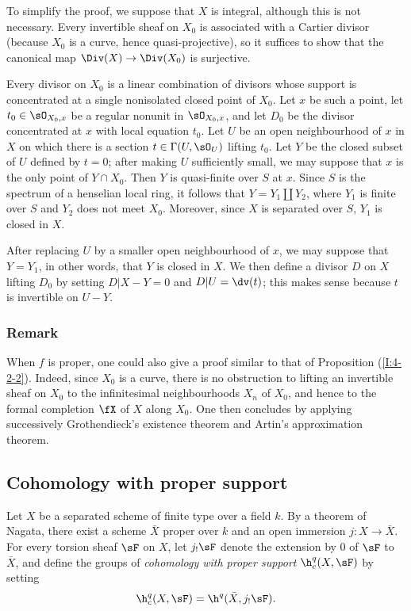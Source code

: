 To simplify the proof, we suppose that $X$ is integral, although this is
not necessary. Every invertible sheaf on $X_0$ is associated with a
Cartier divisor (because $X_0$ is a curve, hence quasi-projective), so it
suffices to show that the canonical map $\Div(X)\to\Div(X_0)$ is
surjective.

Every divisor on $X_0$ is a linear combination of divisors whose support
is concentrated at a single nonisolated closed point of $X_0$. Let $x$
be such a point, let $t_0\in\sO_{X_0,x}$ be a regular nonunit in
$\sO_{X_0,x}$, and let $D_0$ be the divisor concentrated at $x$ with
local equation $t_0$. Let $U$ be an open neighbourhood of $x$ in $X$
on which there is a section $t\in\Gamma(U,\sO_U)$ lifting $t_0$. Let
$Y$ be the closed subset of $U$ defined by $t=0$; after making $U$
sufficiently small, we may suppose that $x$ is the only point of
$Y\cap X_0$. Then $Y$ is quasi-finite over $S$ at $x$. Since $S$ is
the spectrum of a henselian local ring, it follows that
$Y=Y_1\amalg Y_2$, where $Y_1$ is finite over $S$ and $Y_2$ does not
meet $X_0$. Moreover, since $X$ is separated over $S$, $Y_1$ is closed
in $X$.

After replacing $U$ by a smaller open neighbourhood of $x$, we may
suppose that $Y=Y_1$, in other words, that $Y$ is closed in $X$. We then
define a divisor $D$ on $X$ lifting $D_0$ by setting
$D|X- Y=0$ and $D|U=\dv(t)$; this makes sense because $t$ is
invertible on $U- Y$.

\subsubsection{Remark}\label{I:4-4-2}

When $f$ is proper, one could also give a proof similar to that of
Proposition (\ref{I:4-2-2}). Indeed, since $X_0$ is a curve, there is no
obstruction to lifting an invertible sheaf on $X_0$ to the infinitesimal
neighbourhoods $X_n$ of $X_0$, and hence to the formal completion $\fX$
of $X$ along $X_0$. One then concludes by applying successively
Grothendieck's existence theorem and Artin's approximation theorem.

\subsection{Cohomology with proper support}\label{I:4-5}

\begin{definition}\label{I:4-5-1}
Let $X$ be a separated scheme of finite type over a field $k$. By a
theorem of Nagata, there exist a scheme $\bar X$ proper over $k$ and an
open immersion $j:X\to\bar X$. For every torsion sheaf $\sF$ on $X$,
let $j_!\sF$ denote the extension by $0$ of $\sF$ to $\bar X$, and
define the groups of \emph{cohomology with proper support} $\h_c^q(X,\sF)$ by setting
\[
  \h_c^q(X,\sF)=\h^q(\bar X, j_! \sF) \text{.}
\]
\end{definition}

